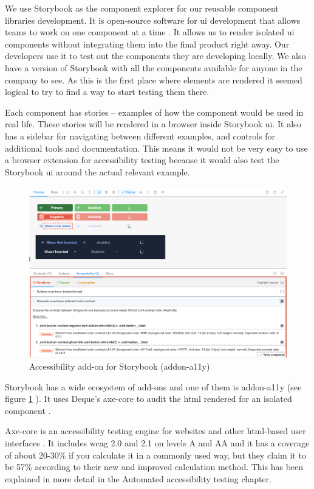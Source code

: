\documentclass{master_thesis}
\begin{document}
We use Storybook as the component explorer for our reusable component libraries development. It is open-source software for \ac{ui} development that allows teams to work on one component at a time \citep{storybook}. It allows us to render isolated \ac{ui} components without integrating them into the final product right away. Our developers use it to test out the components they are developing locally. We also have a version of Storybook with all the components available for anyone in the company to see. As this is the first place where elements are rendered it seemed logical to try to find a way to start testing them there.

Each component has stories – examples of how the component would be used in real life. These stories will be rendered in a browser inside Storybook \ac{ui}. It also has a sidebar for navigating between different examples, and controls for additional tools and documentation. This means it would not be very easy to use a browser extension for accessibility testing because it would also test the Storybook \ac{ui} around the actual relevant example.

\begin{figure}[H]
	\includegraphics[width=\textwidth]{img/addon-a11y.png}
	\caption{Accessibility add-on for Storybook (addon-a11y)}
	\label{fig:addon-a11y}
\end{figure}

Storybook has a wide ecosystem of add-ons and one of them is addon-a11y (see figure \ref{fig:addon-a11y} ). It uses Deque's axe-core to audit the \ac{html} rendered for an isolated component \citep{addon-a11y}.

Axe-core is an accessibility testing engine for websites and other \ac{html}-based user interfaces \citep{Deque2023}. It includes \ac{wcag} 2.0 and 2.1 on levels A and AA and it has a coverage of about 20-30\% if you calculate it in a commonly used way, but they claim it to be 57\% according to their new and improved calculation method. This has been explained in more detail in the Automated accessibility testing chapter.
\end{document}
